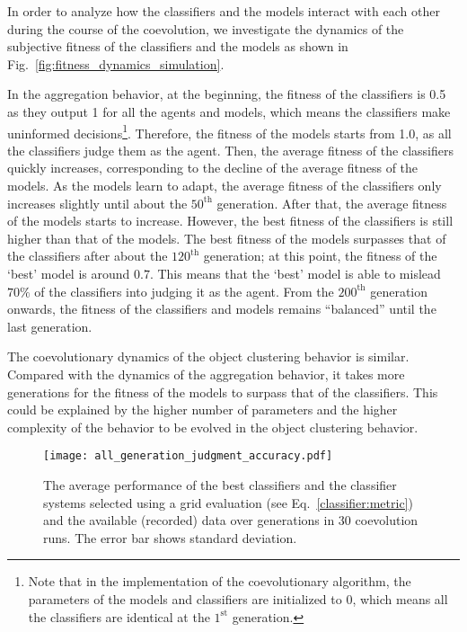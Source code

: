 In order to analyze how the classifiers and the models interact with each other during the course of the coevolution, we investigate the dynamics of the subjective fitness of the classifiers and the models as shown in Fig.~\ref{fig:fitness_dynamics_simulation}. 

In the aggregation behavior, at the beginning, the fitness of the classifiers is 0.5 as they output 1 for all the agents and models, which means the classifiers make uninformed decisions\footnote{Note that in the implementation of the coevolutionary algorithm, the parameters of the models and classifiers are initialized to 0, which means all the classifiers are identical at the $1^{\mathrm{st}}$ generation.}. Therefore, the fitness of the models starts from 1.0, as all the classifiers judge them as the agent. Then, the average fitness of the classifiers quickly increases, corresponding to the decline of the average fitness of the models. As the models learn to adapt, the average fitness of the classifiers only increases slightly until about the $50^{\mathrm{th}}$ generation. After that, the average fitness of the models starts to increase. However, the best fitness of the classifiers is still higher than that of the models. The best fitness of the models surpasses that of the classifiers after about the $120^{\mathrm{th}}$ generation; at this point, the fitness of the `best' model is around $0.7$. This means that the `best' model is able to mislead $70\%$ of the classifiers into judging it as the agent. From the $200^{\mathrm{th}}$ generation onwards, the fitness of the classifiers and models remains ``balanced'' until the last generation. 

The coevolutionary dynamics of the object clustering behavior is similar. Compared with the dynamics of the aggregation behavior, it takes more generations for the fitness of the models to surpass that of the classifiers. This could be explained by the higher number of parameters and the higher complexity of the behavior to be evolved in the object clustering behavior.
\begin{figure}[!t]
	\centering
	\texttt{[image: all\_generation\_judgment\_accuracy.pdf]}
	\caption{The average performance of the best classifiers and the classifier systems selected using a grid evaluation (see Eq.~\eqref{classifier:metric}) and the available (recorded) data over generations in $30$ coevolution runs. The error bar shows standard deviation.}
	\label{fig:all_generation_judgment_accuracy}
\end{figure}


